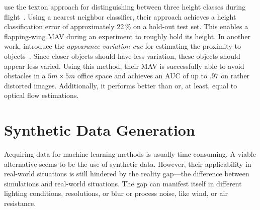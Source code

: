 \citeauthor{de2009design} use the texton approach for distinguishing
between three height classes during flight~\cite{de2009design}. Using
a nearest neighbor classifier, their approach achieves a height
classification error of approximately 22\,\% on a hold-out test set.
This enables a flapping-wing MAV during an experiment to roughly hold
its height. In another work, \citeauthor{de2012appearance} introduce
the \emph{appearance variation cue} for estimating the proximity to
objects~\cite{de2012appearance}. Since closer objects should have less
variation, these objects should appear less varied. Using this method,
their MAV is successfully able to avoid obstacles in a $5m \times 5m$
office space and achieves an AUC of up to .97 on rather distorted
images. Additionally, it performs better than or, at least, equal to
optical flow estimations.
 

\section{Synthetic Data Generation}
\label{sec:syntheticdatageneration}

Acquiring data for machine learning methods is usually time-consuming. A viable alternative seems to be the 
use of synthetic data. However, their applicability in real-world situations is still hindered by
the reality gap---the difference between simulations and
real-world situations. The gap can manifest itself in different
lighting conditions, resolutions, or blur or process noise, like wind,
or air resistance.
